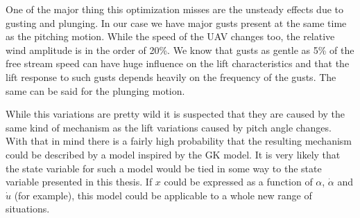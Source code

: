 



One of the major thing this optimization misses are the unsteady effects due to gusting and plunging.
In our case we have major gusts present at the same time as the pitching motion.
While the speed of the UAV changes too, the relative wind amplitude is in the order of 20\%.
We know that gusts as gentle as 5\% of the free stream speed can have huge influence on the lift characteristics and that the lift response to such gusts depends heavily on the frequency of the gusts.
The same can be said for the plunging motion.

\par While this variations are pretty wild it is suspected that they are caused by the same kind of mechanism as the lift variations caused by pitch angle changes.
With that in mind there is a fairly high probability that the resulting mechanism could be described by a model inspired by the GK model.
It is very likely that the state variable for such a model would be tied in some way to the state variable presented in this thesis.
If $x$ could be expressed as a function of $\alpha$, $\dot{\alpha}$ and $\dot{u}$ (for example), this model could be applicable to a whole new range of situations.


